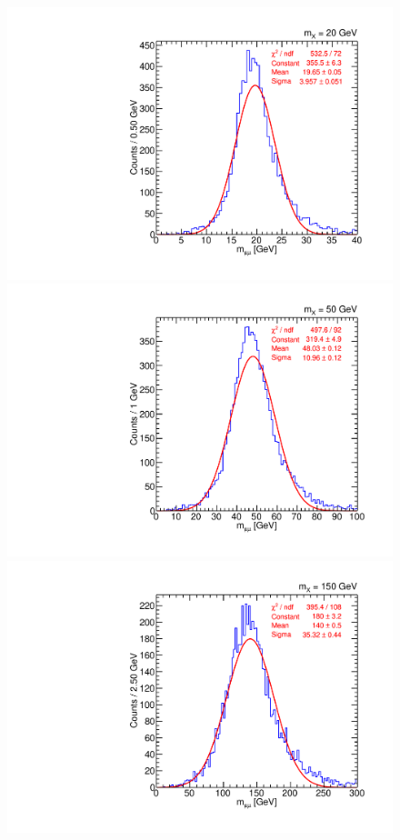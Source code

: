 \begin{figure}[htbp]
  \centering
  \includegraphics[width=\DSquareWidth]{figures/displaced/MASS_2Mu2J_20.pdf}
  \hspace*{-2em}
  \includegraphics[width=\DSquareWidth]{figures/displaced/MASS_2Mu2J_50.pdf} \\
  \includegraphics[width=\DSquareWidth]{figures/displaced/MASS_2Mu2J_150.pdf}

\end{figure}
